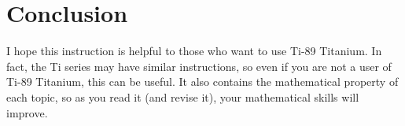 \section{Conclusion}
    I hope this instruction is helpful to those who want to use Ti-89 Titanium. In fact, the Ti series may have similar instructions, so even if you are not a user of Ti-89 Titanium, this can be useful. It also contains the mathematical property of each topic, so as you read it (and revise it), your mathematical skills will improve.